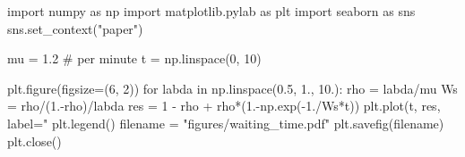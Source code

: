 
import numpy as np
import matplotlib.pylab as plt
import seaborn as sns
sns.set_context("paper")

mu = 1.2 # per minute
t  = np.linspace(0, 10)

plt.figure(figsize=(6, 2))
for labda in np.linspace(0.5, 1., 10.):
   rho = labda/mu
   Ws = rho/(1.-rho)/labda
   res = 1 - rho + rho*(1.-np.exp(-1./Ws*t))
   plt.plot(t, res, label="%
plt.legend()
filename = "figures/waiting_time.pdf"
plt.savefig(filename)
plt.close()


